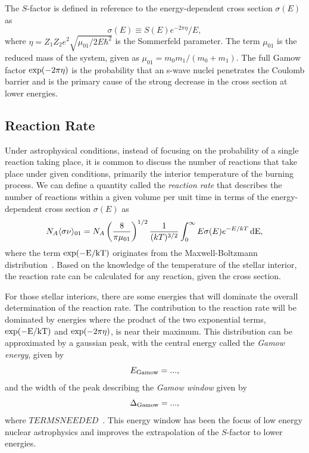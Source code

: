 
The $S$-factor is defined in reference to the energy-dependent cross section
$\sigma(E)$ as
\[
    \sigma(E) \equiv S(E)e^{-2\pi\eta} / E,
\]
where $\eta = Z_1Z_2e^2\sqrt{\mu_{01} / 2E\hbar^2}$ is the Sommerfeld
parameter. The term $\mu_{01}$ is the reduced mass of the system, given as
$\mu_{01} = m_0m_1/(m_0 + m_1)$. The full Gamow factor $\rm{exp}(-2\pi\eta)$ is
the probability that an s-wave nuclei penetrates the Coulomb barrier and is the
primary cause of the strong decrease in the cross section at lower energies.

\subsection{Reaction Rate}

Under astrophysical conditions, instead of focusing on the probability of a
single reaction taking place, it is common to discuss the number of reactions
that take place under given conditions, primarily the interior temperature of
the burning process. We can define a quantity called the \emph{reaction rate}
that describes the number of reactions within a given volume per unit time in
terms of the energy-dependent cross section $\sigma(E)$ as
\begin{equation}
\label{eq:reaction-rate}
    N_A\langle\sigma\nu\rangle_{01} = N_A\left(\frac{8}{\pi\mu_{01}}\right)^{1/2}
        \frac{1}{(kT)^{3/2}}\int_0^{\infty} E\sigma(E)e^{-E/kT}\,\rm{d}E,
\end{equation}
where the term $\rm{exp}(-E/kT)$ originates from the Maxwell-Boltzmann
distribution~\cite{Iliadis}. Based on the knowledge of the temperature of the
stellar interior, the reaction rate can be calculated for any reaction, given
the cross section.

For those stellar interiors, there are some energies that will dominate the
overall determination of the reaction rate. The contribution to the reaction
rate will be dominated by energies where the product of the two exponential
terms, $\rm{exp}(-E/kT)$ and $\rm{exp}(-2\pi\eta)$, is near their maximum. This
distribution can be approximated by a gaussian peak, with the central energy
called the \emph{Gamow energy}, given by
\[
    E_{\rm{Gamow}} = ...,
\]
and the width of the peak describing the \emph{Gamow window} given by
\[
    \Delta_{\rm{Gamow}} = ...,
\]
where $TERMS NEEDED$~\cite{Iliadis}. This energy window has been the focus of
low energy nuclear astrophysics and improves the extrapolation of the
$S$-factor to lower energies.

